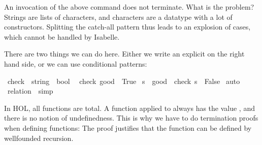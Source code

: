 \begin{isabellebody}
\begin{isamarkuptext}
  \noindent An invocation of the above  command does not
  terminate. What is the problem? Strings are lists of characters, and
  characters are a datatype with a lot of constructors. Splitting the
  catch-all pattern thus leads to an explosion of cases, which cannot
  be handled by Isabelle.

  There are two things we can do here. Either we write an explicit
   on the right hand side, or we can use conditional patterns:%
\end{isamarkuptext}%
\isamarkuptrue%
\isamarkupfalse%
\ check\ {}{}\ {}string\ {}\ bool{}\isanewline
{}\isanewline
\ \ {}check\ {}{}{}good{}{}{}\ {}\ True{}\isanewline
{}\ {}s\ {}\ {}{}good{}{}\ {}\ check\ s\ {}\ False{}\isanewline
%
\isadelimproof
%
\endisadelimproof
%
\isatagproof
{}\isamarkupfalse%
\ auto%
\endisatagproof
{\isafoldproof}%
%
\isadelimproof
\isanewline
%
\endisadelimproof
{}\isamarkupfalse%
%
\isadelimproof
\ %
\endisadelimproof
%
\isatagproof
{}\isamarkupfalse%
\ {}relation\ {}{}{}{}{}\ simp%
\endisatagproof
{\isafoldproof}%
%
\isadelimproof
%
\endisadelimproof
%
\isamarkuptrue%
%
\begin{isamarkuptext}%
In HOL, all functions are total. A function  applied to
   always has the value , and there is no notion
  of undefinedness. 
  This is why we have to do termination
  proofs when defining functions: The proof justifies that the
  function can be defined by wellfounded recursion.


\end{isamarkuptext}
\end{isabellebody}
